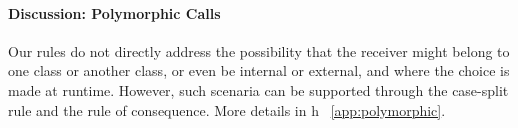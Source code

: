 %
%
%

\paragraph{Discussion: Polymorphic Calls} Our rules do  not directly address the possibility that the receiver might belong to one class or another class, or
even be   internal or external, and
where the choice is made at runtime. 
However, such scenaria  can be  supported through the case-split rule and the rule of consequence. 
More details in h \A\  \ref{app:polymorphic}.

